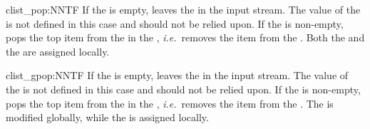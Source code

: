  \begin{docCommand}{clist_pop:NNTF}{    }
   If the  is empty, leaves the  in the
   input stream.  The value of the  is
   not defined in this case and should not be relied upon.  If the
    is non-empty, pops the top item from the
    in the , \emph{i.e.}~removes
   the item from the . Both the  and the
    are assigned locally.
 \end{docCommand}


   \begin{docCommand}{clist_gpop:NNTF}{   }
     If the  is empty, leaves the  in the
   input stream.  The value of the  is
   not defined in this case and should not be relied upon.  If the
    is non-empty, pops the top item from the
    in the , \emph{i.e.}~removes
   the item from the . The  is modified
   globally, while the  is assigned locally.
 \end{docCommand}

